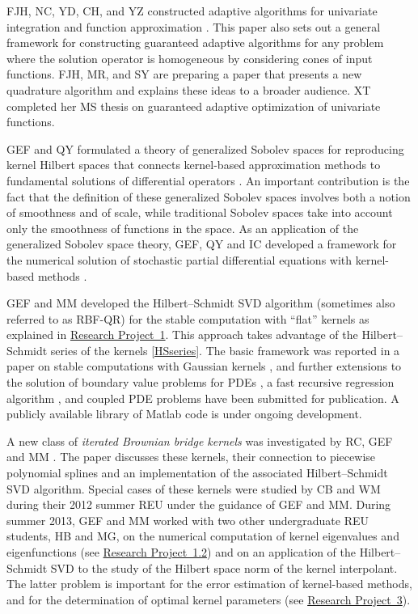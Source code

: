 \documentclass[11pt]{NSFamsart}
\newcommand{\Matlab}{{\sc Matlab}\xspace}
\newcommand{\refproba}{\hyperref[SectHSSVD]{Research Project~1}\xspace}
\newcommand{\refprobab}{\hyperref[NumerEigensubsec]{Research Project~1.2}\xspace}
\newcommand{\refprobc}{\hyperref[combinesec]{Research Project~3}\xspace}
\begin{document}
FJH, NC, YD, CH, and YZ constructed adaptive algorithms for univariate integration and function approximation \citep{HicEtal14b}.  This paper also sets out a general framework for constructing guaranteed adaptive algorithms for any problem where the solution operator is homogeneous by considering cones of input functions.  FJH, MR, and SY are preparing a paper that presents a new quadrature algorithm and explains these ideas to a broader audience.  XT completed her MS thesis \citep{Ton14a} on guaranteed adaptive optimization of univariate functions.

GEF and QY formulated a theory of generalized Sobolev spaces for reproducing kernel Hilbert spaces that connects kernel-based approximation methods to fundamental solutions of differential operators \cite{FasshauerYe11, FasshauerYe13}. An important contribution is the fact that the definition of these generalized Sobolev spaces involves both a notion of smoothness and of scale, while traditional Sobolev spaces take into account only the smoothness of functions in the space.
As an application of the generalized Sobolev space theory, GEF, QY and IC developed a framework for the numerical solution of stochastic partial differential equations with kernel-based methods \citep{CFY12,FasshauerYe13b,FasshauerYe14}.

GEF and MM developed the Hilbert--Schmidt SVD algorithm (sometimes also referred to as RBF-QR) for the stable computation with ``flat'' kernels as explained in \refproba. This approach takes advantage of the Hilbert--Schmidt series of the kernels \eqref{HSseries}. The basic framework was reported in a paper on stable computations with Gaussian kernels \citep{FMcC12}, and further extensions to the solution of boundary value problems for PDEs \citep{McCourt13}, a fast recursive regression algorithm \citep{McCourt13b}, and coupled PDE problems \citep{McCF14} have been submitted for publication. A publicly available library of \Matlab code \citep{McCFBG13} is under ongoing development.

A new class of \emph{iterated Brownian bridge kernels} was investigated by RC, GEF and MM \citep{CavorettoEtAl14}. The paper discusses these kernels, their connection to piecewise polynomial splines and an implementation of the associated Hilbert--Schmidt SVD algorithm. Special cases of these kernels were studied by CB and WM during their 2012 summer REU under the guidance of GEF and MM. During summer 2013, GEF and MM worked with two other undergraduate REU students, HB and MG, on the numerical computation of kernel eigenvalues and eigenfunctions (see \refprobab) and on an application of the Hilbert--Schmidt SVD to the study of the Hilbert space norm of the kernel interpolant. The latter problem is important for the error estimation of kernel-based methods, and for the determination of optimal kernel parameters (see \refprobc).
\end{document}
